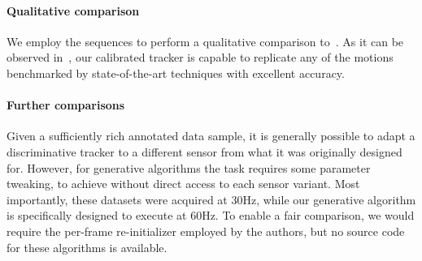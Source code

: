 \paragraph{Qualitative comparison}
We employ the \handy{} sequences to perform a qualitative comparison to~\cite{qian2014realtime,sridhar2015fast,sharp2015accurate,taylor2016concerto}. As it can be observed in~\VideoExtra{}, our calibrated tracker is capable to replicate any of the motions benchmarked by state-of-the-art techniques with excellent accuracy.

\paragraph{Further comparisons}
Given a sufficiently rich annotated data sample, it is generally possible to adapt a discriminative tracker to a different sensor from what it was originally designed for. However, for generative algorithms the task requires some parameter tweaking,  to achieve without direct access to each sensor variant. 
Most importantly, these datasets were acquired at 30Hz, while our generative algorithm is specifically designed to execute at 60Hz. To enable a fair comparison, we would require the  per-frame re-initializer employed by the authors, but no source code for these algorithms is available.




